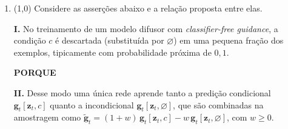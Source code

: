 \documentclass[11pt,a4paper]{article}
\begin{document}
\begin{enumerate}[1)]
\begin{enumerate}[a)]
    \item $0{,}05$ e $0{,}95$; a \textit{loss} original fornece o maior sinal de aprendizado.
    \item $0{,}95$ e $0{,}05$; a \textit{loss} original fornece o maior sinal de aprendizado.
    \item $0{,}05$ e $0{,}05$; as duas \textit{losses} saturam igualmente no início do treino.
    \item $0{,}05$ e $0{,}95$; a \textit{loss} \textit{non-saturating} fornece o maior sinal de aprendizado.
    \item $0{,}95$ e $0{,}05$; a \textit{loss} \textit{non-saturating} fornece o maior sinal de aprendizado.
    \item $0{,}0475$ e $0{,}0475$; as duas \textit{losses} fornecem exatamente o mesmo sinal.
    \item $0{,}95$ e $0{,}95$; as duas \textit{losses} fornecem sinal forte no início do treino.
    \item $0$ e $1$; apenas a \textit{loss} \textit{non-saturating} tem gradiente definido nesse ponto.
\end{enumerate}

\item (1{,}0) Considere as asserções abaixo e a relação proposta entre elas.

\textbf{I.} No treinamento de um modelo difusor com \textit{classifier-free guidance}, a condição $c$ é descartada (substituída por $\varnothing$) em uma pequena fração dos exemplos, tipicamente com probabilidade próxima de $0{,}1$.

\begin{center}\textbf{PORQUE}\end{center}

\textbf{II.} Desse modo uma única rede aprende tanto a predição condicional $\mathbf{g}_t[\mathbf{z}_t, c]$ quanto a incondicional $\mathbf{g}_t[\mathbf{z}_t, \varnothing]$, que são combinadas na amostragem como $\tilde{\mathbf{g}}_t = (1+w)\,\mathbf{g}_t[\mathbf{z}_t, c] - w\,\mathbf{g}_t[\mathbf{z}_t, \varnothing]$, com $w \geq 0$.


\end{enumerate}
\end{document}
